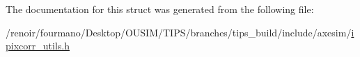 The documentation for this struct was generated from the following file:\begin{DoxyCompactItemize}
\item 
/renoir/fourmano/Desktop/OUSIM/TIPS/branches/tips\_\-build/include/axesim/\hyperlink{ipixcorr__utils_8h}{ipixcorr\_\-utils.h}\end{DoxyCompactItemize}
